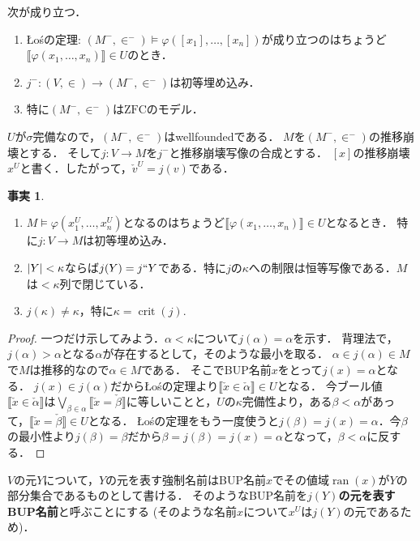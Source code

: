 \documentclass[uplatex,dvipdfmx]{jsarticle}
\newcommand{\range}{\operatorname{ran}}
\newcommand{\ZFC}{\mathrm{ZFC}}
\newcommand{\crit}{\operatorname{crit}}
\DeclarePairedDelimiter\abs{\lvert}{\rvert}
\newcommand{\truth}[1]{\llbracket #1 \rrbracket}
\theoremstyle{definition}
\newtheorem{fact}[thm]{事実}
\begin{document}
	次が成り立つ．
	\begin{enumerate}
		\item Łośの定理: $(M^-, \in^-) \models \varphi([x_1], \dots, [x_n])$が成り立つのはちょうど$\truth{\varphi(x_1, \dots, x_n)} \in U$のとき．
		\item $j^- \colon (V, \in) \to (M^-, \in^-)$は初等埋め込み．
		\item 特に$(M^-, \in^-)$は$\ZFC$のモデル．
	\end{enumerate}
	
	$U$が$\sigma$完備なので，$(M^-, \in^-)$はwellfoundedである．
	$M$を$(M^-, \in^-)$の推移崩壊とする．
	そして$j \colon V \to M$を$j^-$と推移崩壊写像の合成とする．
	$[x]$の推移崩壊$x^U$と書く．したがって，$\check{v}^U = j(v)$である．

	\begin{fact}
	\begin{enumerate}
		\item $M \models \varphi(x_1^U, \dots, x_n^U)$となるのはちょうど$\truth{\varphi(x_1, \dots, x_n)} \in U$となるとき．
		特に$j \colon V \to M$は初等埋め込み．
		\item $\abs{Y} < \kappa$ならば$j(Y) = j``Y$である．特に$j$の$\kappa$への制限は恒等写像である．$M$は${<}\kappa$列で閉じている．
		\item $j(\kappa) \ne \kappa$，特に$\kappa = \crit(j)$.
	\end{enumerate}
	\end{fact}
	\begin{proof}
		一つだけ示してみよう．$\alpha < \kappa$について$j(\alpha) = \alpha$を示す．
		背理法で，$j(\alpha) > \alpha$となる$\alpha$が存在するとして，そのような最小を取る．
		$\alpha \in j(\alpha) \in M$で$M$は推移的なので$\alpha \in M$である．
		そこでBUP名前$x$をとって$j(x) = \alpha$となる．
		$j(x) \in j(\alpha)$だからŁośの定理より$\truth{\check{x} \in \check{\alpha}} \in U$となる．
		今ブール値$\truth{\check{x} \in \check{\alpha}}$は$\bigvee_{\beta \in \alpha} \truth{\check{x} = \check{\beta}}$に等しいことと，$U$の$\kappa$完備性より，ある$\beta < \alpha$があって，$\truth{\check{x} = \check{\beta}} \in U$となる．
		Łośの定理をもう一度使うと$j(\beta) = j(x) = \alpha$．今$\beta$の最小性より$j(\beta) = \beta$だから$\beta = j(\beta) = j(x) = \alpha$となって，$\beta < \alpha$に反する．
	\end{proof}

	$V$の元$Y$について，$Y$の元を表す強制名前はBUP名前$x$でその値域$\range(x)$が$Y$の部分集合であるものとして書ける．
	そのようなBUP名前を\textbf{$j(Y)$の元を表すBUP名前}と呼ぶことにする (そのような名前$x$について$x^U$は$j(Y)$の元であるため)．
\end{document}
